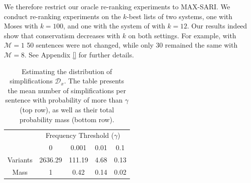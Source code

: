 \documentclass[letterpaper, 11pt]{article}
\newcommand{\oa}[1]{}
\begin{document}
We therefore restrict our oracle re-ranking experiments to MAX-SARI. We conduct re-ranking experiments on the $k$-best
lists of two systems\oa{on what corpora?}, one with Moses \cite{} with $k=100$, and one with the system of \newcite{} with $k=12$. Our results
indeed show that conservatism decreases with $k$ on both settings. 
For example, with $\mathcal{M}=1$ 50 sentences were not changed\oa{by Moses?}, while only 30 remained the same 
with $\mathcal{M}=8$. See Appendix \ref{} for further details.

\oa{omitted paragraph here. i think we don't have space.}



\begin{table}[h!]
	\vspace{-0.5cm}
	\centering
	\small
	\singlespacing
	\begin{tabular}{c|c|c|c|c|}
		& \multicolumn{4}{c|}{Frequency Threshold ($\gamma$)}\\ 
		& \multicolumn{1}{c}{0} & \multicolumn{1}{c}{0.001} & \multicolumn{1}{c}{0.01} & \multicolumn{1}{c|}{0.1}
		\\
		\hline
		Variants & 2636.29 & 111.19 & 4.68 & 0.13
		\\
		Mass & 1 & 0.42 & 0.14 & 0.02\\
		\hline
	\end{tabular}
	\caption{\label{tab:simplifications_dist}
		Estimating the distribution of simplifications $\mathcal{D}_x$.
		The table presents the mean number of simplifications per sentence with probability of more than
		$\gamma$ (top row), as well as their total probability mass (bottom row).
	}
	\vspace{-0.3cm}
\end{table}
\end{document}
